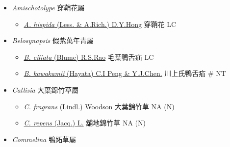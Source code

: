 
  \begin{itemize}
 \item[] \textit{Amischotolype} 穿鞘花屬
                                
  \begin{itemize}
        \item[] \href{http://www.theplantlist.org/tpl1.1/search?q=Amischotolype+hispida}{\textit{A. hispida} (Less. \& A.Rich.) D.Y.Hong}   穿鞘花   LC
  \end{itemize}
 \item[] \textit{Belosynapsis} 假紫萬年青屬
                                
  \begin{itemize}
        \item[] \href{http://www.theplantlist.org/tpl1.1/search?q=Belosynapsis+ciliata}{\textit{B. ciliata} (Blume) R.S.Rao}   毛葉鴨舌疝   LC
        \item[] \href{http://www.theplantlist.org/tpl1.1/search?q=Belosynapsis+kawakamii}{\textit{B. kawakamii} (Hayata) C.I Peng \& Y.J.Chen.}   川上氏鴨舌疝  \# NT
  \end{itemize}
 \item[] \textit{Callisia} 大葉錦竹草屬
                                
  \begin{itemize}
        \item[] \href{http://www.theplantlist.org/tpl1.1/search?q=Callisia+fragrans}{\textit{C. fragrans} (Lindl.) Woodson}   大葉錦竹草   NA (N)
        \item[] \href{http://www.theplantlist.org/tpl1.1/search?q=Callisia+repens}{\textit{C. repens} (Jacq.) L.}   舖地錦竹草   NA (N)
  \end{itemize}
 \item[] \textit{Commelina} 鴨跖草屬
                                

\end{itemize}
